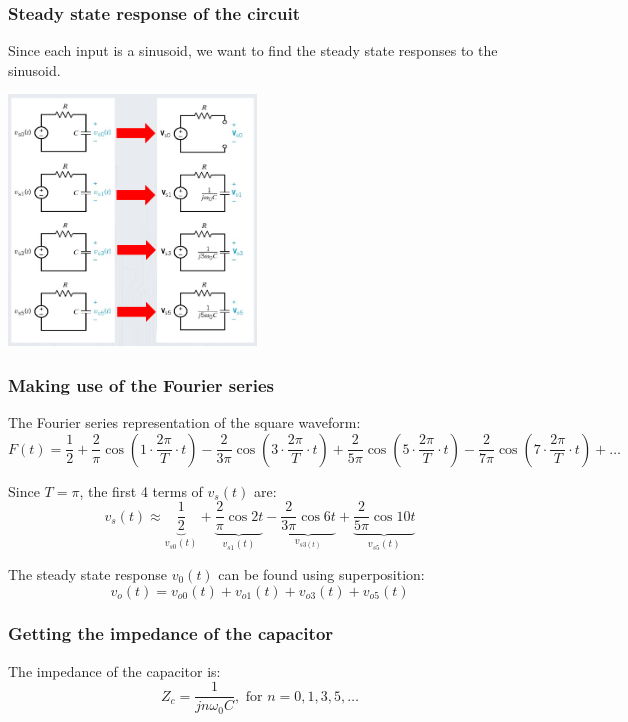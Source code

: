 \documentclass[11pt]{article}
\begin{document}
\subsubsection{Steady state response of the circuit}
\label{sec:orgaa68990}
Since each input is a sinusoid, we want to find the steady state responses to the sinusoid.
\begin{center}
\includegraphics[height=18em]{./images/rc-circuit-steady-state-response.png}
\end{center}
\subsubsection{Making use of the Fourier series}
\label{sec:orgd55fb33}
The Fourier series representation of the square waveform:
\[F(t) = \frac{1}{2} + \frac{2}{\pi} \cos \left(1 \cdot \frac{2 \pi}{T} \cdot t \right) - \frac{2}{3 \pi} \cos \left( 3 \cdot \frac{2 \pi}{T} \cdot t \right) + \frac{2}{5 \pi} \cos \left( 5 \cdot \frac{2 \pi}{T} \cdot t \right) - \frac{2}{7 \pi} \cos \left( 7 \cdot \frac{2 \pi}{T} \cdot t \right) + \ldots\]

Since \(T = \pi\), the first 4 terms of \(v_s (t)\) are:
\[v_s(t) \approx \underbrace{\frac{1}{2}}_{v_{s0} (t)} + \underbrace{\frac{2}{\pi} \cos 2t}_{v_{s1} (t)} - \underbrace{\frac{2}{3 \pi} \cos 6t}_{v_{s3 (t)}} + \underbrace{\frac{2}{5 \pi} \cos 10t}_{v_{s5} (t)}\]

The steady state response \(v_0 (t)\) can be found using superposition:
\[v_o (t) = v_{o0} (t) + v_{o1} (t) + v_{o3} (t) + v_{o5} (t)\]
\subsubsection{Getting the impedance of the capacitor}
\label{sec:org745965f}
The impedance of the capacitor is:
\[Z_c = \frac{1}{jn \omega_0 C}, \text{ for } n = 0, 1, 3, 5, \ldots\]
\end{document}
